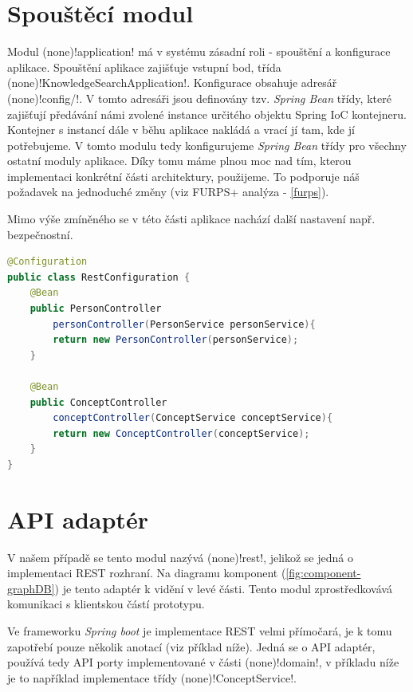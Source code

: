 \section{Spouštěcí modul}
Modul \ctulst(none)!application! má v systému zásadní roli - spouštění a konfigurace aplikace. Spouštění aplikace zajišťuje vstupní bod, třída \ctulst(none)!KnowledgeSearchApplication!. Konfigurace obsahuje adresář \ctulst(none)!config/!. V tomto adresáři jsou definovány tzv. \textit{Spring Bean} třídy, které zajišťují předávání námi zvolené instance určitého objektu Spring IoC kontejneru. Kontejner s instancí dále v běhu aplikace nakládá a vrací jí tam, kde jí potřebujeme.
V tomto modulu tedy konfigurujeme \textit{Spring Bean} třídy pro všechny ostatní moduly aplikace. Díky tomu máme plnou moc nad tím, kterou implementaci konkrétní části architektury, použijeme. To podporuje náš požadavek na jednoduché změny (viz FURPS+ analýza - \ref{furps}).\par
Mimo výše zmíněného se v této části aplikace nachází další nastavení např. bezpečnostní.
\begin{lstlisting}[language=JAVA, caption= Příklad konfigurace REST kontrolerů, captionpos=b]
@Configuration
public class RestConfiguration {
    @Bean
    public PersonController 
        personController(PersonService personService){
        return new PersonController(personService);
    }

    @Bean
    public ConceptController 
        conceptController(ConceptService conceptService){
        return new ConceptController(conceptService);
    }
}
\end{lstlisting}
\section{API adaptér}
V našem případě se tento modul nazývá \ctulst(none)!rest!, jelikož se jedná o implementaci REST rozhraní. Na diagramu komponent (\ref{fig:component-graphDB}) je tento adaptér k vidění v levé části. Tento modul zprostředkovává komunikaci s klientskou částí prototypu.\par
Ve frameworku \textit{Spring boot} je implementace REST velmi přímočará, je k tomu zapotřebí pouze několik anotací (viz příklad níže). Jedná se o API adaptér, používá tedy API porty implementované v části \ctulst(none)!domain!, v příkladu níže je to například implementace třídy \ctulst(none)!ConceptService!.\par

